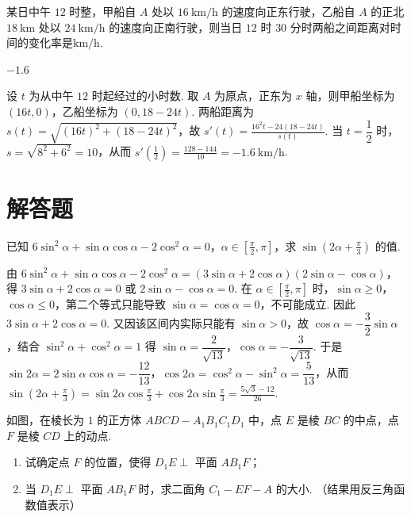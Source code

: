 \begin{problem}
某日中午 \(12\) 时整，甲船自 \(A\) 处以 \(16\mathrm{~km/h}\) 的速度向正东行驶，乙船自 \(A\) 的正北 \(18\mathrm{~km}\) 处以 \(24\mathrm{~km/h}\) 的速度向正南行驶，则当日 \(12\) 时 \(30\) 分时两船之间距离对时间的变化率是\fillinblank{}\(\mathrm{km/h}\).
\end{problem}

\begin{answer}
\(-1.6\)
\end{answer}

\begin{solution}
设 \(t\) 为从中午 \(12\) 时起经过的小时数. 取 \(A\) 为原点，正东为 \(x\) 轴，则甲船坐标为 \((16t,0)\)，乙船坐标为 \((0,18-24t)\). 两船距离为 \(s(t)=\sqrt{(16t)^2+(18-24t)^2}\)，故
\(\displaystyle s'(t)=\frac{16^2t-24(18-24t)}{s(t)}\). 当 \(t=\dfrac12\) 时，\(s=\sqrt{8^2+6^2}=10\)，从而 \(\displaystyle s'\left(\frac12\right)=\frac{128-144}{10}=-1.6\mathrm{~km/h}\).
\end{solution}

\section{解答题}
\begin{problem}
已知 \(6\sin^2\alpha + \sin \alpha \cos \alpha - 2\cos^2\alpha = 0\)，\(\alpha \in \left[\frac{\pi}{2}, \pi\right]\)，求 \(\sin \left(2\alpha + \frac{\pi}{3}\right)\) 的值.
\end{problem}

\begin{solution}
由 \(6\sin^2\alpha+\sin\alpha\cos\alpha-2\cos^2\alpha=(3\sin\alpha+2\cos\alpha)(2\sin\alpha-\cos\alpha)\)，得 \(3\sin\alpha+2\cos\alpha=0\) 或 \(2\sin\alpha-\cos\alpha=0\). 在 \(\alpha\in[\frac\pi2,\pi]\) 时，\(\sin\alpha\geqslant0\)，\(\cos\alpha\leqslant0\)，第二个等式只能导致 \(\sin\alpha=\cos\alpha=0\)，不可能成立. 因此 \(3\sin\alpha+2\cos\alpha=0\). 又因该区间内实际只能有 \(\sin\alpha>0\)，故 \(\cos\alpha=-\dfrac32\sin\alpha\)，结合 \(\sin^2\alpha+\cos^2\alpha=1\) 得 \(\sin\alpha=\dfrac{2}{\sqrt{13}}\)，\(\cos\alpha=-\dfrac{3}{\sqrt{13}}\). 于是 \(\sin2\alpha=2\sin\alpha\cos\alpha=-\dfrac{12}{13}\)，\(\cos2\alpha=\cos^2\alpha-\sin^2\alpha=\dfrac{5}{13}\)，从而
\(\displaystyle\sin\left(2\alpha+\frac\pi3\right)=\sin2\alpha\cos\frac\pi3+\cos2\alpha\sin\frac\pi3=\frac{5\sqrt3-12}{26}\).
\end{solution}

\begin{problem}
如图，在棱长为 \(1\) 的正方体 \(ABCD - A_{1}B_{1}C_{1}D_{1}\) 中，点 \(E\) 是棱 \(BC\) 的中点，点 \(F\) 是棱 \(CD\) 上的动点.

\begin{enumerate}
\item 试确定点 \(F\) 的位置，使得 \(D_{1}E \perp\) 平面 \(AB_{1}F\)；
\item 当 \(D_{1}E \perp\) 平面 \(AB_{1}F\) 时，求二面角 \(C_{1} - EF - A\) 的大小. （结果用反三角函数值表示）
\end{enumerate}

\end{problem}

